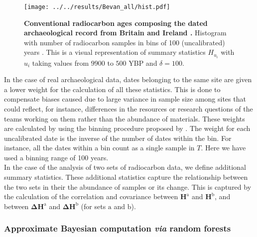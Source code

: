\documentclass[a4paper]{article}
\begin{document}
\begin{figure}
\center\texttt{[image: ../../results/Bevan\_all/hist.pdf]}
\caption[Figure shows an histogram of the number of radiocarbon samples in bins of 100 years between 10000 and 5000 uncalibrated YBP. The height of the bars are low (below 50) for more ancient times until around 5000 uncalibrated YBP when a strong increase is apparent with bars reaching values around 300, followed by a small decrease. A second increase occurs aroung 4000 uncalibrated YBP, with bars reaching values around 500.]{\textbf{Conventional radiocarbon ages composing the dated archaeological record from Britain and Ireland \parencite{Bevan2017a}.} Histogram with number of radiocarbon samples in bins of 100 (uncalibrated) years \parencite[samples from the same site are weighted similarly to the procedure proposed by][]{Shennan2013}. This is a visual representation of summary statistics $H_{u_i}$ with $u_i$ taking values from $9900$ to $500$ YBP and $\delta=100$.}
\label{fig:data}
\end{figure}


In the case of real archaeological data, dates belonging to the same site are given a lower weight for the calculation of all these statistics. This is done to compensate biases caused due to large variance in sample size among sites that could reflect, for instance, differences in the resources or research questions of the teams working on them rather than the abundance of materials. These weights are calculated by using the binning procedure proposed by \textcite{Shennan2013}. The weight for each uncalibrated date is the inverse of the number of dates within the bin. For instance, all the dates within a bin count as a single sample in $T$. Here we have used a binning range of 100 years.
\\


In the case of the analysis of two sets of radiocarbon data, we define additional summary statistics. These additional statistics capture the relationship between the two sets in their the abundance of samples or its change. This is captured by the calculation of the correlation and covariance between $\bm{H}^\mathrm{a}$ and $\bm{H}^\mathrm{b}$, and between $\bm{\Delta H}^\mathrm{a}$ and $\bm{\Delta H}^\mathrm{b}$ (for sets $\mathrm{a}$ and $\mathrm{b}$).
\\




\subsubsection*{Approximate Bayesian computation \emph{via} random forests}
\end{document}
